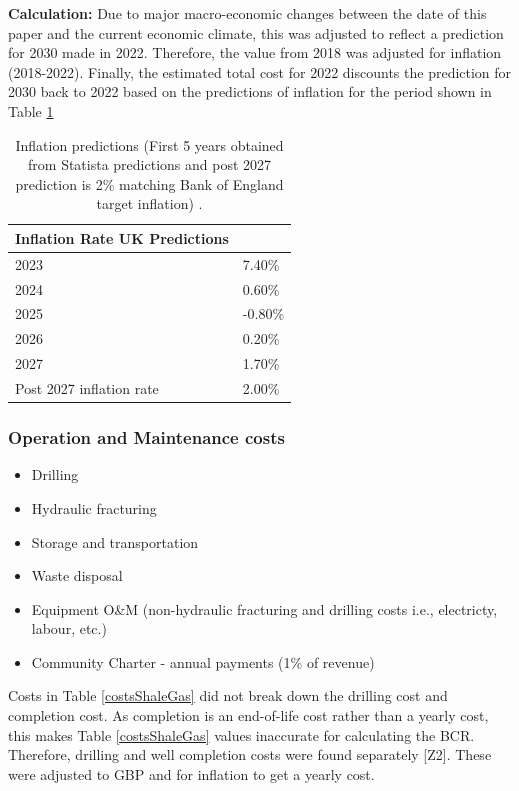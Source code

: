 \documentclass[10pt]{article}
\begin{document}
\textbf{Calculation:}
Due to major macro-economic changes between the date of this paper and the current economic climate, this was adjusted to reflect a prediction for 2030 made in 2022. Therefore, the value from 2018 was adjusted for inflation (2018-2022). Finally, the estimated total cost for 2022 discounts the prediction for 2030 back to 2022 based on the predictions of inflation for the period shown in Table \ref{inflation}
\begin{table}[H]
    \centering
    \begin{tabular}{@{}ll@{}}
        \toprule
        \textbf{Inflation Rate UK Predictions} & \\
        \midrule
        2023 & 7.40\% \\
        2024 & 0.60\% \\
        2025 & -0.80\% \\
        2026 & 0.20\% \\
        2027 & 1.70\% \\
        Post 2027 inflation rate & 2.00\% \\
        \bottomrule
    \end{tabular}
    \caption{Inflation predictions (First 5 years obtained from Statista predictions and post 2027 prediction is 2\% matching Bank of England target inflation) \cite{012}.}
    \label{inflation}
\end{table}
\subsubsection{Operation and Maintenance costs}
\begin{itemize}
    \item Drilling
    \item Hydraulic fracturing
    \item Storage and transportation
    \item Waste disposal
    \item Equipment O\&M (non-hydraulic fracturing and drilling costs i.e., electricty, labour, etc.)
    \item Community Charter - annual payments (1\% of revenue)
\end{itemize}
Costs in Table \ref{costsShaleGas} did not break down the drilling cost and completion cost. As completion is an end-of-life cost rather than a yearly cost, this makes Table \ref{costsShaleGas} values inaccurate for calculating the BCR. Therefore, drilling and well completion costs were found separately [Z2]. These were adjusted to GBP and for inflation to get a yearly cost. 
\end{document}
